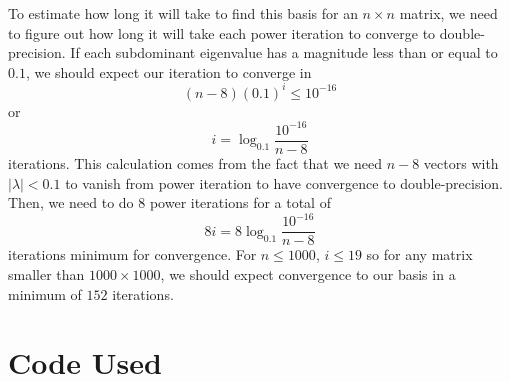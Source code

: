 \documentclass[a4paper,12pt]{article}
\newcommand{\abs}[1]{\left| #1 \right|}
\begin{document}
\begin{enumerate}[label = (\arabic*)]
 	To estimate how long it will take to find this basis for an $ n \times n $ matrix, we need to figure out how long it will take each power iteration to converge to double-precision. If each subdominant eigenvalue has a magnitude less than or equal to $ 0.1 $, we should expect our iteration to converge in
 	\[
 		(n - 8) (0.1)^i \leq 10^{-16}
 	\]
 	or
 	\[
 		i = \log_{0.1} \frac{10^{-16}}{n - 8}
 	\]
 	iterations. This calculation comes from the fact that we need $ n - 8 $ vectors with $ \abs{\lambda} < 0.1 $ to vanish from power iteration to have convergence to double-precision.
 	Then, we need to do 8 power iterations for a total of 
 	\[
 		8 i = 8 \log_{0.1} \frac{10^{-16}}{n - 8}
 	\]
 	iterations minimum for convergence. For $ n \leq 1000 $, $ i \leq 19 $ so for any matrix smaller than $ 1000 \times 1000 $, we should expect convergence to our basis in a minimum of $ 152 $  iterations.
\end{enumerate}

\newpage
\section*{Code Used}\label{sec:code}
\end{document}
